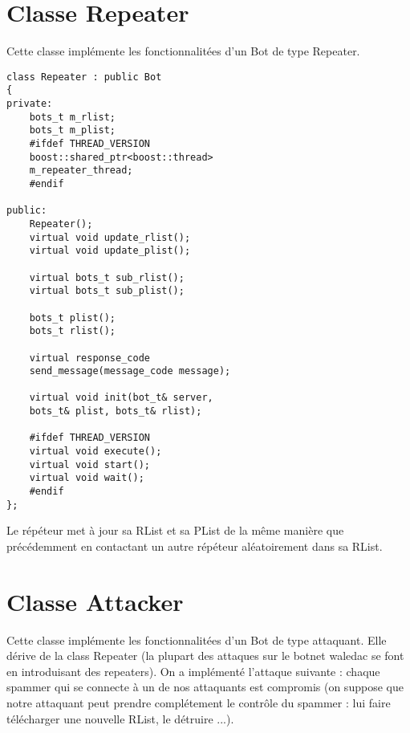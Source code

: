\documentclass[11pt]{article}
\begin{document}
\newpage
\section{Classe Repeater}
Cette classe implémente les fonctionnalitées d'un Bot de type Repeater.\\

\begin{minipage}[c]{.46\linewidth}
\begin{verbatim} 
class Repeater : public Bot
{
private:
	bots_t m_rlist;
	bots_t m_plist;
	#ifdef THREAD_VERSION
	boost::shared_ptr<boost::thread> 
	m_repeater_thread;
	#endif

public:
	Repeater();
	virtual void update_rlist();
	virtual void update_plist();
	
	virtual bots_t sub_rlist();
	virtual bots_t sub_plist();
	
	bots_t plist();
	bots_t rlist();
	
	virtual response_code 
	send_message(message_code message);
	
	virtual void init(bot_t& server, 
	bots_t& plist, bots_t& rlist);
	
	#ifdef THREAD_VERSION
	virtual void execute();
	virtual void start();
	virtual void wait();
	#endif
};
\end{verbatim}	
\end{minipage} \hfill
\begin{minipage}[c]{.46\linewidth}
Le répéteur met à jour sa RList et sa PList de la même manière que précédemment en contactant un autre répéteur aléatoirement dans sa RList.
\end{minipage}


\newpage
\section{Classe Attacker}
Cette classe implémente les fonctionnalitées d'un Bot de type attaquant. Elle dérive de la class Repeater (la plupart des attaques sur le botnet 
waledac se font en introduisant des repeaters). On a implémenté l'attaque suivante : chaque spammer qui se connecte à un de nos attaquants est compromis (on suppose que notre attaquant peut prendre complétement le contrôle du spammer : lui faire télécharger une nouvelle RList, le détruire ...).\\\\ 
\end{document}
